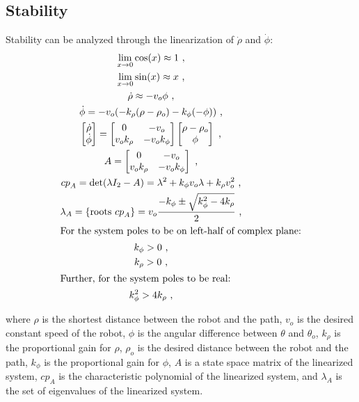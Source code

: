 \documentclass[11pt, letterpaper]{article}
\numberwithin{equation}{section}
\begin{document}
\pagebreak

\subsection{Stability}

Stability can be analyzed through the linearization of $\dot{\rho}$ and $\dot{\phi}$:
\begin{gather}
    \lim_{x \rightarrow 0} \cos(x) \approx 1 \text{ ,} \\
    \lim_{x \rightarrow 0} \sin(x) \approx x \text{ ,} \\
    \dot{\rho} \approx -v_o \phi \text{ ,} \\
    \dot{\phi} = -v_o(-k_\rho(\rho - \rho_o) - k_\phi(-\phi)) \text{ ,} \\
    \begin{bmatrix} \dot{\rho} \\ \dot{\phi} \end{bmatrix} = \begin{bmatrix} 0 & -v_o \\ v_o k_\rho & -v_o k_\phi \end{bmatrix} \begin{bmatrix} \rho - \rho_o \\ \phi \end{bmatrix} \text{ ,} \\
    A = \begin{bmatrix} 0 & -v_o \\ v_o k_\rho & -v_o k_\phi \end{bmatrix} \text{ ,} \\
    {cp}_A = \det(\lambda I_2 - A) = \lambda^2 + k_\phi v_o \lambda + k_\rho v_o^2 \text{ ,} \\
    \lambda_A = \{\text{roots } {cp}_A \} = v_o \frac{-k_\phi \pm \sqrt{k_\phi^2 - 4 k_\rho}}{2} \text{ ,} \\
    \intertext{For the system poles to be on left-half of complex plane:}
    k_\phi > 0 \text{ ,} \\
    k_\rho > 0 \text{ ,} \\
    \intertext{Further, for the system poles to be real:}
    k_\phi^2 > 4 k_\rho \text{ ,}
\end{gather}

where $\rho$ is the shortest distance between the robot and the path, $v_o$ is the desired constant speed of the robot, $\phi$ is the angular difference between $\theta$ and $\theta_o$, $k_\rho$ is the proportional gain for $\rho$, $\rho_o$ is the desired distance between the robot and the path, $k_\phi$ is the proportional gain for $\phi$, $A$ is a state space matrix of the linearized system, ${cp}_A$ is the characteristic polynomial of the linearized system, and $\lambda_A$ is the set of eigenvalues of the linearized system.
\end{document}
